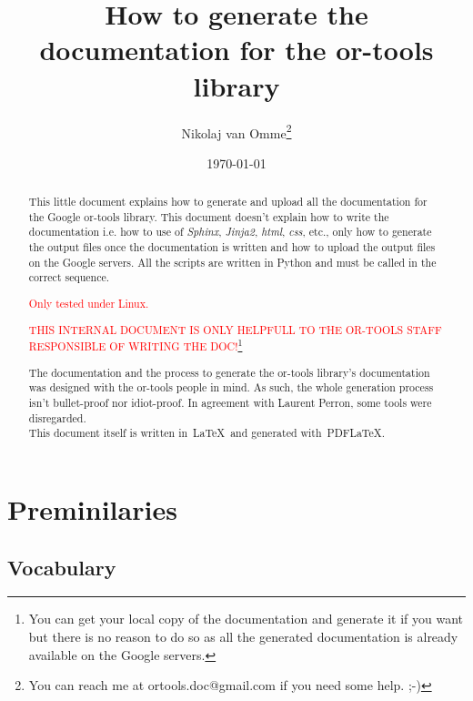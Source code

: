 \documentclass[a4paper,10pt]{article}
\title{How to generate the documentation for the or-tools library}
\author{Nikolaj van Omme\footnote{You can reach me at ortools.doc@gmail.com if you need some help. ;-) }}
\date{\today}
\begin{document}
\maketitle

\begin{abstract}
This little document explains how to generate and upload all the documentation for the Google or-tools library. This document doesn't explain how to write the documentation i.e. how to use of \emph{Sphinx}, \emph{Jinja2}, \emph{html}, \emph{css}, etc., only how to generate the output files once
the documentation is written and how to upload the output files on the Google servers. All the scripts are written in Python and must be called in the correct sequence.\\
\begin{center}\textcolor{red}{Only tested under Linux.}\end{center}
\begin{center}\textcolor{red}{THIS INTERNAL DOCUMENT IS ONLY HELPFULL TO THE OR-TOOLS STAFF RESPONSIBLE OF WRITING THE DOC!}\footnote{You can get your local copy of the documentation and generate it if you want but there is no reason to do so as all the generated documentation is already available on the Google servers.}\end{center}

The documentation and the process to generate the or-tools library's documentation was designed with the or-tools people in mind. As such, the whole generation process isn't bullet-proof nor idiot-proof. In agreement with Laurent Perron, some tools were disregarded.\\

This document itself is written in~\LaTeX\ and generated with~PDF\LaTeX.

\end{abstract}

\setcounter{tocdepth}{2}
\tableofcontents


\section{Preminilaries}


\subsection{Vocabulary}
\end{document}
